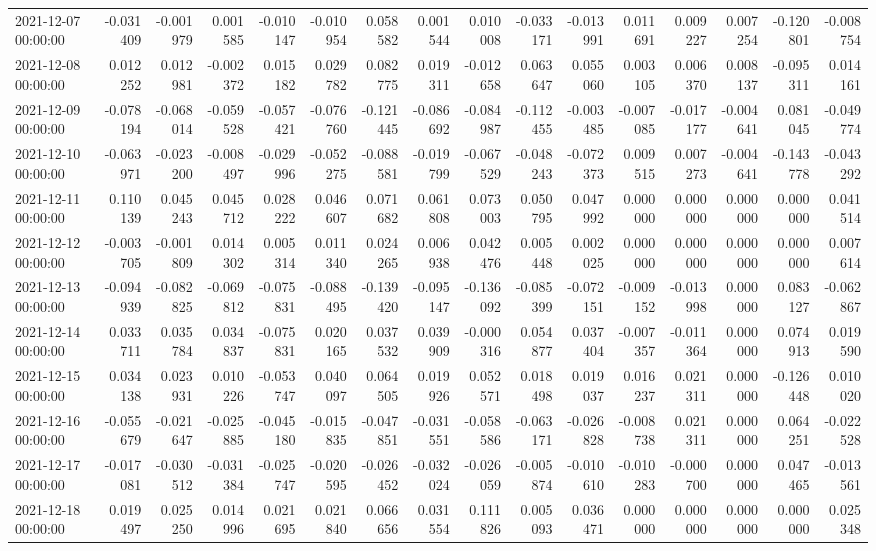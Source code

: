 \begin{tabular}{lrrrrrrrrrrrrrrr}
2021-12-07 00:00:00 & -0.031409 & -0.001979 & 0.001585 & -0.010147 & -0.010954 & 0.058582 & 0.001544 & 0.010008 & -0.033171 & -0.013991 & 0.011691 & 0.009227 & 0.007254 & -0.120801 & -0.008754 \\
2021-12-08 00:00:00 & 0.012252 & 0.012981 & -0.002372 & 0.015182 & 0.029782 & 0.082775 & 0.019311 & -0.012658 & 0.063647 & 0.055060 & 0.003105 & 0.006370 & 0.008137 & -0.095311 & 0.014161 \\
2021-12-09 00:00:00 & -0.078194 & -0.068014 & -0.059528 & -0.057421 & -0.076760 & -0.121445 & -0.086692 & -0.084987 & -0.112455 & -0.003485 & -0.007085 & -0.017177 & -0.004641 & 0.081045 & -0.049774 \\
2021-12-10 00:00:00 & -0.063971 & -0.023200 & -0.008497 & -0.029996 & -0.052275 & -0.088581 & -0.019799 & -0.067529 & -0.048243 & -0.072373 & 0.009515 & 0.007273 & -0.004641 & -0.143778 & -0.043292 \\
2021-12-11 00:00:00 & 0.110139 & 0.045243 & 0.045712 & 0.028222 & 0.046607 & 0.071682 & 0.061808 & 0.073003 & 0.050795 & 0.047992 & 0.000000 & 0.000000 & 0.000000 & 0.000000 & 0.041514 \\
2021-12-12 00:00:00 & -0.003705 & -0.001809 & 0.014302 & 0.005314 & 0.011340 & 0.024265 & 0.006938 & 0.042476 & 0.005448 & 0.002025 & 0.000000 & 0.000000 & 0.000000 & 0.000000 & 0.007614 \\
2021-12-13 00:00:00 & -0.094939 & -0.082825 & -0.069812 & -0.075831 & -0.088495 & -0.139420 & -0.095147 & -0.136092 & -0.085399 & -0.072151 & -0.009152 & -0.013998 & 0.000000 & 0.083127 & -0.062867 \\
2021-12-14 00:00:00 & 0.033711 & 0.035784 & 0.034837 & -0.075831 & 0.020165 & 0.037532 & 0.039909 & -0.000316 & 0.054877 & 0.037404 & -0.007357 & -0.011364 & 0.000000 & 0.074913 & 0.019590 \\
2021-12-15 00:00:00 & 0.034138 & 0.023931 & 0.010226 & -0.053747 & 0.040097 & 0.064505 & 0.019926 & 0.052571 & 0.018498 & 0.019037 & 0.016237 & 0.021311 & 0.000000 & -0.126448 & 0.010020 \\
2021-12-16 00:00:00 & -0.055679 & -0.021647 & -0.025885 & -0.045180 & -0.015835 & -0.047851 & -0.031551 & -0.058586 & -0.063171 & -0.026828 & -0.008738 & 0.021311 & 0.000000 & 0.064251 & -0.022528 \\
2021-12-17 00:00:00 & -0.017081 & -0.030512 & -0.031384 & -0.025747 & -0.020595 & -0.026452 & -0.032024 & -0.026059 & -0.005874 & -0.010610 & -0.010283 & -0.000700 & 0.000000 & 0.047465 & -0.013561 \\
2021-12-18 00:00:00 & 0.019497 & 0.025250 & 0.014996 & 0.021695 & 0.021840 & 0.066656 & 0.031554 & 0.111826 & 0.005093 & 0.036471 & 0.000000 & 0.000000 & 0.000000 & 0.000000 & 0.025348 \\

\end{tabular}

